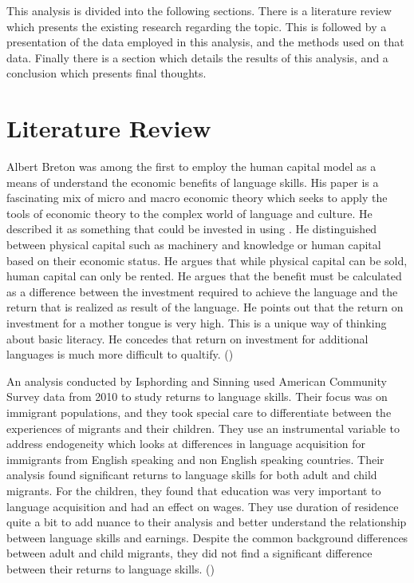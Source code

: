 \documentclass[12pt,english]{article}
\begin{document}
This analysis is divided into the following sections. There is a literature review which presents the existing research regarding the topic. This is followed by a presentation of the data employed in this analysis, and the methods used on that data. Finally there is a section which details the results of this analysis, and a conclusion which presents final thoughts. 

\section{Literature Review}\label{sec:litreview}

Albert Breton was among the first to employ the human capital model as a means of understand the economic benefits of language skills. His paper is a fascinating mix of micro and macro economic theory which seeks to apply the tools of economic theory to the complex world of language and culture. He described it as something that could be invested in using . He distinguished between physical capital such as machinery and knowledge or human capital based on their economic status. He argues that while physical capital can be sold, human capital can only be rented. He argues that the benefit must be calculated as a difference between the investment required to achieve the language and the return that is realized as result of the language. He points out that the return on investment for a mother tongue is very high. This is a unique way of thinking about basic literacy. He concedes that return on investment for additional languages is much more difficult to qualtify. (\citet{Canada})


An analysis conducted by Isphording and Sinning used American Community Survey data from 2010 to study returns to language skills. Their focus was on immigrant populations, and they took special care to differentiate between the experiences of migrants and their children. They use an instrumental variable to address endogeneity which looks at differences in language acquisition for immigrants from English speaking and non English speaking countries. Their analysis found significant returns to language skills for both adult and child migrants. For the children, they found that education was very important to language acquisition and had an effect on wages. They use duration of residence quite a bit to add nuance to their analysis and better understand the relationship between language skills and earnings. Despite the common background differences between adult and child migrants, they did not find a significant difference between their returns to language skills.  (\citet{Rhur})
\end{document}
